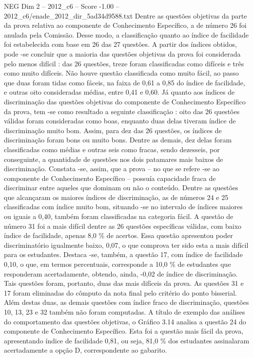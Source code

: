 \begin{textsample}{NEG Dim 2 – 2012\_c6 – Score -1.00 – 2012\_c6/enade\_2012\_dir\_5ad34d9588.txt}
Dentre as questões objetivas da parte da prova relativa ao componente de Conhecimento Específico, a de número 26 foi anulada pela Comissão.
Desse modo, a classificação quanto ao índice de facilidade foi estabelecida com base em 26 das 27 questões.
A partir dos índices obtidos, pode -se concluir que a maioria das questões objetivas da prova foi considerada pelo menos difícil : das 26 questões, treze foram classificadas como difíceis e três como muito difíceis.
Não houve questão classificada como muito fácil, ao passo que duas foram tidas como fáceis, na faixa de 0,61 a 0,85 do índice de facilidade, e outras oito consideradas médias, entre 0,41 e 0,60.
Já quanto aos índices de discriminação das questões objetivas do componente de Conhecimento Específico da prova, tem -se como resultado a seguinte classificação : oito das 26 questões válidas foram consideradas como boas, enquanto duas delas tiveram índice de discriminação muito bom.
Assim, para dez das 26 questões, os índices de discriminação foram bons ou muito bons.
Dentre as demais, dez delas foram classificadas como médias e outras seis como fracas, sendo dezesseis, por conseguinte, a quantidade de questões nos dois patamares mais baixos de discriminação.
Constata -se, assim, que a prova – no que se refere -se ao componente de Conhecimento Específico – possuía capacidade fraca de discriminar entre aqueles que dominam ou não o conteúdo.
Dentre as questões que alcançaram os maiores índices de discriminação, as de números 24 e 25 classificadas com índice muito bom, situando -se no intervalo de índices maiores ou iguais a 0,40, também foram classificadas na categoria fácil.
A questão de número 31 foi a mais difícil dentre as 26 questões específicas válidas, com baixo índice de facilidade, apenas 8,0 \% de acertos.
Essa questão apresentou poder discriminatório igualmente baixo, 0,07, o que comprova ter sido esta a mais difícil para os estudantes.
Destaca -se, também, a questão 17, com índice de facilidade 0,10, o que, em termos percentuais, corresponde a 10,0 \% de estudantes que responderam acertadamente, obtendo, ainda, -0,02 de índice de discriminação.
Tais questões foram, portanto, duas das mais difíceis da prova.
As questões 31 e 17 foram eliminadas do cômputo da nota final pelo critério do ponto bisserial.
Além destas duas, as demais questões com índice fraco de discriminação, questões 10, 13, 23 e 32 também não foram computadas.
A título de exemplo das análises do comportamento das questões objetivas, o Gráfico 3.14 analisa a questão 24 do componente de Conhecimento Específico.
Esta foi a questão mais fácil da prova, apresentando índice de facilidade 0,81, ou seja, 81,0 \% dos estudantes assinalaram acertadamente a opção D, correspondente ao gabarito.

\end{textsample}
